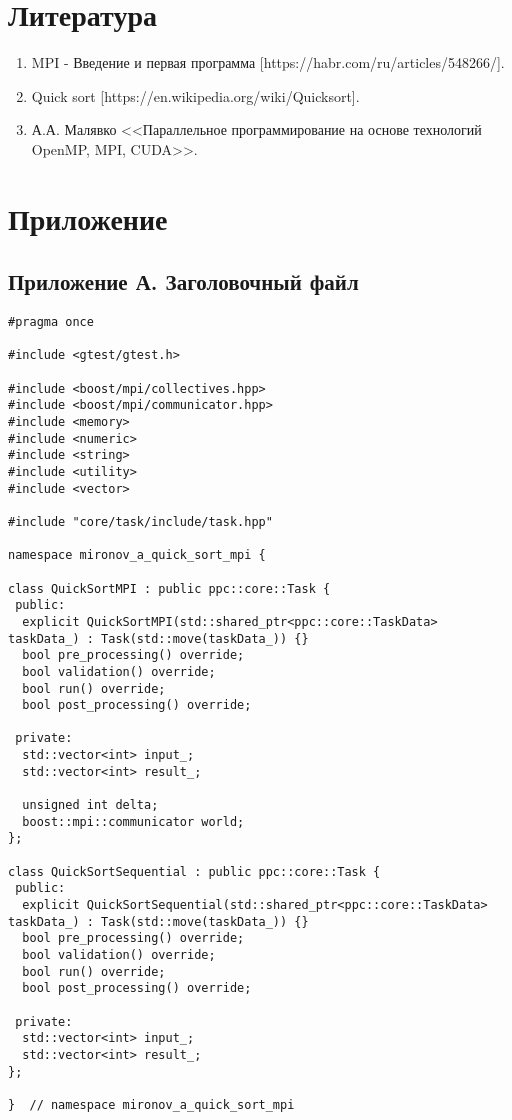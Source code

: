 \documentclass[12pt]{article}
\begin{document}
\newpage
\section*{Литература}

\begin{enumerate}
    \item MPI - Введение и первая программа [https://habr.com/ru/articles/548266/].
    \item Quick sort [https://en.wikipedia.org/wiki/Quicksort].
    \item {А.А. Малявко <<Параллельное программирование на основе технологий OpenMP, MPI, CUDA>>}.
\end{enumerate}

\newpage
\appendix
\section*{Приложение}
\subsection*{Приложение А. Заголовочный файл}
\begin{lstlisting}
#pragma once

#include <gtest/gtest.h>

#include <boost/mpi/collectives.hpp>
#include <boost/mpi/communicator.hpp>
#include <memory>
#include <numeric>
#include <string>
#include <utility>
#include <vector>

#include "core/task/include/task.hpp"

namespace mironov_a_quick_sort_mpi {

class QuickSortMPI : public ppc::core::Task {
 public:
  explicit QuickSortMPI(std::shared_ptr<ppc::core::TaskData> taskData_) : Task(std::move(taskData_)) {}
  bool pre_processing() override;
  bool validation() override;
  bool run() override;
  bool post_processing() override;

 private:
  std::vector<int> input_;
  std::vector<int> result_;

  unsigned int delta;
  boost::mpi::communicator world;
};

class QuickSortSequential : public ppc::core::Task {
 public:
  explicit QuickSortSequential(std::shared_ptr<ppc::core::TaskData> taskData_) : Task(std::move(taskData_)) {}
  bool pre_processing() override;
  bool validation() override;
  bool run() override;
  bool post_processing() override;

 private:
  std::vector<int> input_;
  std::vector<int> result_;
};

}  // namespace mironov_a_quick_sort_mpi

\end{lstlisting}
\end{document}
